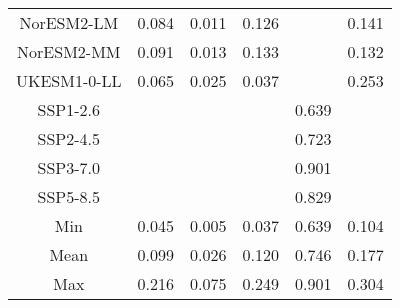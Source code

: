 \begin{table*}[t]
\begin{tabular}{c|rrr|rr}
NorESM2-LM & 0.084 & 0.011 & 0.126 &  & 0.141 \\
NorESM2-MM & 0.091 & 0.013 & 0.133 &  & 0.132 \\
UKESM1-0-LL & 0.065 & 0.025 & 0.037 &  & 0.253 \\
SSP1-2.6 &  &  &  & 0.639 &  \\
SSP2-4.5 &  &  &  & 0.723 &  \\
SSP3-7.0 &  &  &  & 0.901 &  \\
SSP5-8.5 &  &  &  & 0.829 &  \\
\midrule
Min & 0.045 & 0.005 & 0.037 & 0.639 & 0.104 \\
Mean & 0.099 & 0.026 & 0.120 & 0.746 & 0.177 \\
Max & 0.216 & 0.075 & 0.249 & 0.901 & 0.304 \\
\bottomrule
\end{tabular}
\end{table*}
